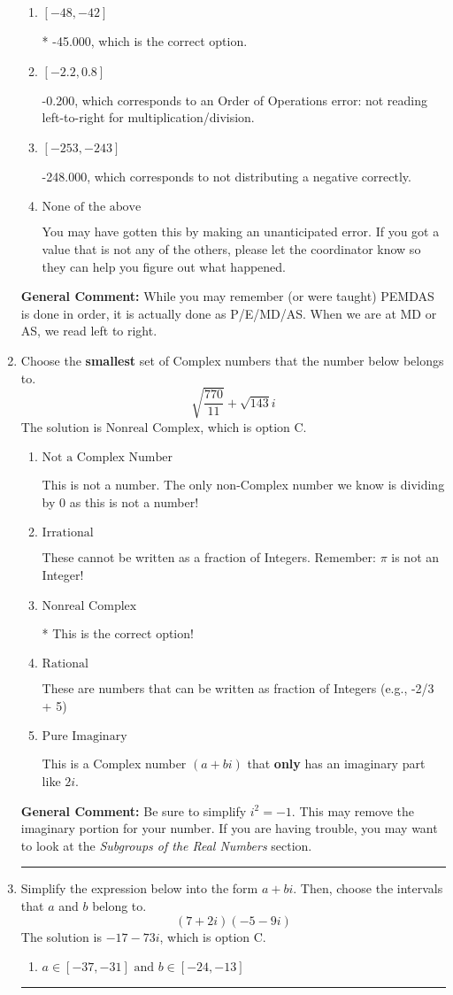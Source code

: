 \documentclass{extbook}[14pt]
\newcommand{\litem}[1]{\item #1

\rule{\textwidth}{0.4pt}}
\begin{document}
\begin{enumerate}
{\begin{enumerate}[label=\Alph*.]
 31.800, which corresponds to not distributing addition and subtraction correctly.
\item \( [-48, -42] \)

* -45.000, which is the correct option.
\item \( [-2.2, 0.8] \)

 -0.200, which corresponds to an Order of Operations error: not reading left-to-right for multiplication/division.
\item \( [-253, -243] \)

 -248.000, which corresponds to not distributing a negative correctly.
\item \( \text{None of the above} \)

 You may have gotten this by making an unanticipated error. If you got a value that is not any of the others, please let the coordinator know so they can help you figure out what happened.
\end{enumerate}

\textbf{General Comment:} While you may remember (or were taught) PEMDAS is done in order, it is actually done as P/E/MD/AS. When we are at MD or AS, we read left to right.
}
\litem{
Choose the \textbf{smallest} set of Complex numbers that the number below belongs to.
\[ \sqrt{\frac{770}{11}}+\sqrt{143} i \]The solution is \( \text{Nonreal Complex} \), which is option C.\begin{enumerate}[label=\Alph*.]
\item \( \text{Not a Complex Number} \)

This is not a number. The only non-Complex number we know is dividing by 0 as this is not a number!
\item \( \text{Irrational} \)

These cannot be written as a fraction of Integers. Remember: $\pi$ is not an Integer!
\item \( \text{Nonreal Complex} \)

* This is the correct option!
\item \( \text{Rational} \)

These are numbers that can be written as fraction of Integers (e.g., -2/3 + 5)
\item \( \text{Pure Imaginary} \)

This is a Complex number $(a+bi)$ that \textbf{only} has an imaginary part like $2i$.
\end{enumerate}

\textbf{General Comment:} Be sure to simplify $i^2 = -1$. This may remove the imaginary portion for your number. If you are having trouble, you may want to look at the \textit{Subgroups of the Real Numbers} section.
}
\litem{
Simplify the expression below into the form $a+bi$. Then, choose the intervals that $a$ and $b$ belong to.
\[ (7 + 2 i)(-5 - 9 i) \]The solution is \( -17 - 73 i \), which is option C.\begin{enumerate}[label=\Alph*.]
\item \( a \in [-37, -31] \text{ and } b \in [-24, -13] \)


\end{enumerate}}
\end{enumerate}
\end{document}
